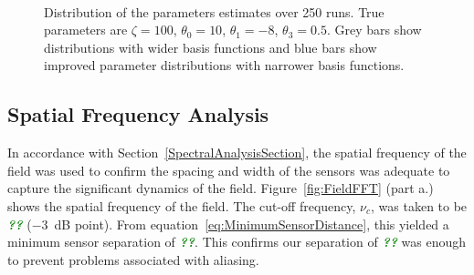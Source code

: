 \documentclass[12pt]{iopart}
\newcommand{\omg}[1]{\textsf{\emph{\textbf{\textcolor{green}{#1}}}}}
\begin{document}
\begin{figure}[th]
\\
\caption{Distribution of the parameters estimates over 250
runs. True parameters are $\zeta=100$, $\theta_0 = 10$, $\theta_1 = -8$, $\theta_3 = 0.5$. Grey bars show distributions with wider basis functions and blue bars show improved parameter distributions with narrower basis functions.}
\label{fig:Parameters}
\end{figure}
\subsection{Spatial Frequency Analysis} In accordance with Section~\ref{SpectralAnalysisSection}, the spatial frequency of the field was used to confirm the spacing and width of the sensors was adequate to capture the significant dynamics of the field. Figure~\ref{fig:FieldFFT} (part a.) shows the spatial frequency of the field. The cut-off frequency, $\nu_c$, was taken to be \omg{??} ($-3$~dB point). From equation~\ref{eq:MinimumSensorDistance}, this yielded a minimum sensor separation of \omg{??}. This confirms our separation of \omg{??} was enough to prevent problems associated with aliasing.
\end{document}
